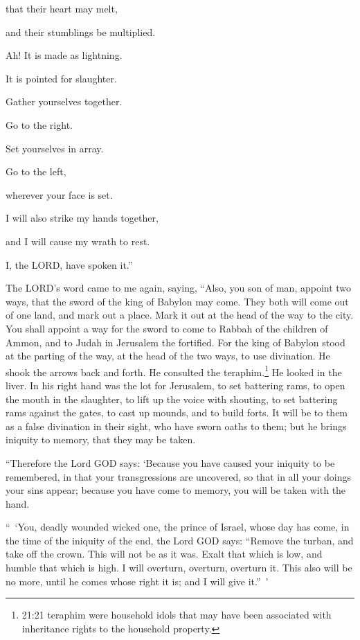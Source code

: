 that their heart may melt,

and their stumblings be multiplied.

Ah! It is made as lightning.

It is pointed for slaughter.

\myverse{}Gather yourselves together.

Go to the right.

Set yourselves in array.

Go to the left,

wherever your face is set.

\myverse{}I will also strike my hands together,

and I will cause my wrath to rest.

I, the LORD, have spoken it.”

\myverse{}The LORD’s word came to me again, saying,
\myverse{}“Also, you son of man, appoint two ways, that the sword of the king of Babylon
may come. They both will come out of one land, and mark out a place. Mark it out at the head of the way
to the city.
\myverse{}You shall appoint a way for the sword to come to Rabbah of the children of
Ammon, and to Judah in Jerusalem the fortified.
\myverse{}For the king of Babylon stood at the parting of the way, at the head of the
two ways, to use divination. He shook the arrows back and forth. He consulted the teraphim.\footnote{21:21 teraphim were household idols that may have been associated with inheritance rights to the household
	property.} He looked in the liver.
\myverse{}In his right hand was the lot for Jerusalem, to set battering rams, to open
the mouth in the slaughter, to lift up the voice with shouting, to set battering rams against the gates,
to cast up mounds, and to build forts.
\myverse{}It will be to them as a false divination in their sight, who have sworn oaths
to them; but he brings iniquity to memory, that they may be taken.

\myverse{}“Therefore the Lord GOD says: ‘Because you have caused your
iniquity to be remembered, in that your transgressions are uncovered, so that in all your doings your
sins appear; because you have come to memory, you will be taken with the hand.

\myverse{}“ ‘You, deadly wounded wicked one, the prince of Israel, whose
day has come, in the time of the iniquity of the end,
\myverse{}the Lord GOD says: “Remove the turban, and take off the crown. This will
not be as it was. Exalt that which is low, and humble that which is high.
\myverse{}I will overturn, overturn, overturn it. This also will be no more, until
he comes whose right it is; and I will give it.” ’

